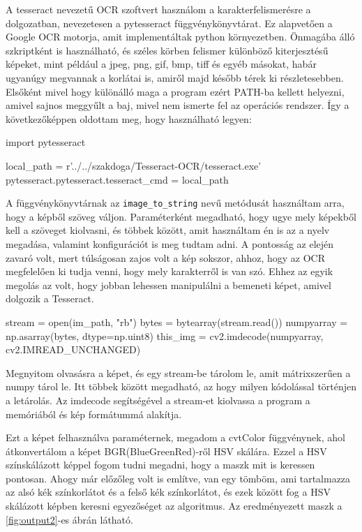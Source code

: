 A tesseract nevezetű OCR szoftvert használom a karakterfelismerésre a dolgozatban, nevezetesen a pytesseract függvénykönyvtárat. Ez alapvetően a Google OCR motorja, amit implementáltak python környezetben. Önmagába álló szkriptként is használható, és széles körben felismer különböző kiterjesztésű képeket, mint például a jpeg, png, gif, bmp, tiff és egyéb másokat, habár ugyanúgy megvannak a korlátai is, amiről majd később térek ki részletesebben. Elsőként mivel hogy különálló maga a program ezért PATH-ba kellett helyezni, amivel sajnos meggyűlt a baj, mivel nem ismerte fel az operációs rendszer. Így a következőképpen oldottam meg, hogy használható legyen:
\begin{python}
	import pytesseract
	
	local_path = r'../../szakdoga/Tesseract-OCR/tesseract.exe'
	pytesseract.pytesseract.tesseract_cmd = local_path
\end{python}
A függvénykönyvtárnak az \texttt{image\_to\_string} nevű metódusát használtam arra, hogy a képből szöveg váljon. Paraméterként megadható, hogy ugye mely képekből kell a szöveget kiolvasni, és többek között, amit használtam én is az a nyelv megadása, valamint konfigurációt is meg tudtam adni. A pontosság az elején zavaró volt, mert túlságosan zajos volt a kép sokszor, ahhoz, hogy az OCR megfelelően ki tudja venni, hogy mely karakterről is van szó. Ehhez az egyik megolás az volt, hogy jobban lehessen manipulálni a bemeneti képet, amivel dolgozik a Tesseract.
\par
{}
\begin{python}
stream = open(im_path, "rb")
bytes = bytearray(stream.read())
numpyarray = np.asarray(bytes, dtype=np.uint8)
this_img = cv2.imdecode(numpyarray, cv2.IMREAD_UNCHANGED)
\end{python}
Megnyitom olvasásra a képet, és egy stream-be tárolom le, amit mátrixszerűen a numpy tárol le. Itt többek között megadható, az hogy milyen kódolással történjen a letárolás. Az imdecode segítségével a stream-et kiolvassa a program a memóriából és kép formátummá alakítja.
\par
Ezt a képet felhasználva paraméternek, megadom a cvtColor függvénynek, ahol átkonvertálom a képet BGR(BlueGreenRed)-ről HSV skálára. Ezzel a HSV színskálázott képpel fogom tudni megadni, hogy a maszk mit is keressen pontosan. Ahogy már előzőleg volt is említve, van egy tömböm, ami tartalmazza az alsó kék színkorlátot és a felső kék színkorlátot, és ezek között fog a HSV skálázott képben keresni egyezőséget az algoritmus. Az eredményezett maszk a \ref{fig:output2}-es ábrán látható. 
